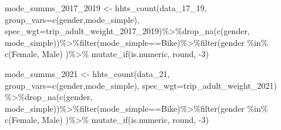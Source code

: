 \documentclass[
  12pt,
]{article}
\newenvironment{Shaded}{\begin{snugshade}}{\end{snugshade}}
\newcommand{\AttributeTok}[1]{\textcolor[rgb]{0.77,0.63,0.00}{#1}}
\newcommand{\DecValTok}[1]{\textcolor[rgb]{0.00,0.00,0.81}{#1}}
\newcommand{\FunctionTok}[1]{\textcolor[rgb]{0.00,0.00,0.00}{#1}}
\newcommand{\NormalTok}[1]{#1}
\newcommand{\OtherTok}[1]{\textcolor[rgb]{0.56,0.35,0.01}{#1}}
\newcommand{\SpecialCharTok}[1]{\textcolor[rgb]{0.00,0.00,0.00}{#1}}
\newcommand{\StringTok}[1]{\textcolor[rgb]{0.31,0.60,0.02}{#1}}
\begin{document}
\begin{Shaded}
\begin{Highlighting}[]
\NormalTok{mode\_summs\_2017\_2019 }\OtherTok{\textless{}{-}} \FunctionTok{hhts\_count}\NormalTok{(data\_17\_19,}
                                        \AttributeTok{group\_vars=}\FunctionTok{c}\NormalTok{(}\StringTok{\textquotesingle{}gender\textquotesingle{}}\NormalTok{,}\StringTok{\textquotesingle{}mode\_simple\textquotesingle{}}\NormalTok{),}
                                        \AttributeTok{spec\_wgt=}\StringTok{\textquotesingle{}trip\_adult\_weight\_2017\_2019\textquotesingle{}}\NormalTok{)}\SpecialCharTok{\%\textgreater{}\%}\FunctionTok{drop\_na}\NormalTok{(}\FunctionTok{c}\NormalTok{(}\StringTok{\textquotesingle{}gender\textquotesingle{}}\NormalTok{, }\StringTok{\textquotesingle{}mode\_simple\textquotesingle{}}\NormalTok{))}\SpecialCharTok{\%\textgreater{}\%}\FunctionTok{filter}\NormalTok{(mode\_simple}\SpecialCharTok{==}\StringTok{\textquotesingle{}Bike\textquotesingle{}}\NormalTok{)}\SpecialCharTok{\%\textgreater{}\%}\FunctionTok{filter}\NormalTok{(gender }\SpecialCharTok{\%in\%} \FunctionTok{c}\NormalTok{(}\StringTok{\textquotesingle{}Female\textquotesingle{}}\NormalTok{, }\StringTok{\textquotesingle{}Male\textquotesingle{}}\NormalTok{) )}\SpecialCharTok{\%\textgreater{}\%} \FunctionTok{mutate\_if}\NormalTok{(is.numeric, round, }\SpecialCharTok{{-}}\DecValTok{3}\NormalTok{)}

\NormalTok{mode\_summs\_2021 }\OtherTok{\textless{}{-}} \FunctionTok{hhts\_count}\NormalTok{(data\_21,}
                                   \AttributeTok{group\_vars=}\FunctionTok{c}\NormalTok{(}\StringTok{\textquotesingle{}gender\textquotesingle{}}\NormalTok{,}\StringTok{\textquotesingle{}mode\_simple\textquotesingle{}}\NormalTok{),}
                                   \AttributeTok{spec\_wgt=}\StringTok{\textquotesingle{}trip\_adult\_weight\_2021\textquotesingle{}}\NormalTok{) }\SpecialCharTok{\%\textgreater{}\%}\FunctionTok{drop\_na}\NormalTok{(}\FunctionTok{c}\NormalTok{(}\StringTok{\textquotesingle{}gender\textquotesingle{}}\NormalTok{, }\StringTok{\textquotesingle{}mode\_simple\textquotesingle{}}\NormalTok{))}\SpecialCharTok{\%\textgreater{}\%}\FunctionTok{filter}\NormalTok{(mode\_simple}\SpecialCharTok{==}\StringTok{\textquotesingle{}Bike\textquotesingle{}}\NormalTok{)}\SpecialCharTok{\%\textgreater{}\%}\FunctionTok{filter}\NormalTok{(gender }\SpecialCharTok{\%in\%} \FunctionTok{c}\NormalTok{(}\StringTok{\textquotesingle{}Female\textquotesingle{}}\NormalTok{, }\StringTok{\textquotesingle{}Male\textquotesingle{}}\NormalTok{) )}\SpecialCharTok{\%\textgreater{}\%} \FunctionTok{mutate\_if}\NormalTok{(is.numeric, round, }\SpecialCharTok{{-}}\DecValTok{3}\NormalTok{)}
\end{Highlighting}
\end{Shaded}
\end{document}
